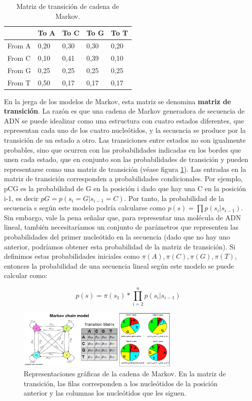 \begin{table}[htbp]
    \centering
    \begin{tabularx}{\textwidth}{ X | X X X X}
          & To A & To C & To G & To T \\ \hline
         From A & 0,20 & 0,30 & 0,30 & 0,20 \\
         From C & 0,10 & 0,41 & 0,39 & 0,10 \\
         From G & 0,25 & 0,25 & 0,25 & 0,25 \\
         From T & 0,50 & 0,17 & 0,17 & 0,17 \\
    \end{tabularx}
    \caption{Matriz de transición de cadena de Markov.}
    \label{tab:matrix}
\end{table}

En la jerga de los modelos de Markov, esta matriz se denomina \textbf{matriz de transición}. La razón es que una cadena de Markov generadora de secuencia de ADN se puede idealizar como una estructura con cuatro estados diferentes, que representan cada uno de los cuatro nucleótidos, y la secuencia se produce por la transición de un estado a otro. Las transiciones entre estados no son igualmente probables, sino que ocurren con las probabilidades indicadas en los bordes que unen cada estado, que en conjunto son las probabilidades de transición y pueden representarse como una matriz de transición (véase figura \ref{fig:markov}).
Las entradas en la matriz de transición corresponden a probabilidades condicionales. Por ejemplo, pCG es la probabilidad de G en la posición i dado que hay una C en la posición i-1, es decir $pG = p(s_i = G|s_{i-1} = C)$. Por tanto, la probabilidad de la secuencia s según este modelo podría calcularse como $ p(s) = \prod p(s_i | s_{i-1}) $. Sin embargo, vale la pena señalar que, para representar una molécula de ADN lineal, también necesitaríamos un conjunto de parámetros que representen las probabilidades del primer nucleótido en la secuencia (dado que no hay uno anterior, podríamos obtener esta probabilidad de la matriz de transición). Si definimos estas probabilidades iniciales como $\pi(A), \pi(C), \pi(G), \pi(T)$, entonces la probabilidad de una secuencia lineal según este modelo se puede calcular como:

 $$ p(s) = \pi(s_1) * \prod_{i=2}^{n} p(s_i | s_{i-1}) $$
 
\begin{figure}[htbp]
\centering
\includegraphics[width = 0.7\textwidth]{figs/markov.png}
\caption{Representaciones gráficas de la cadena de Markov. En la matriz de transición, las filas corresponden a los nucleótidos de la posición anterior y las columnas los nucleótidos que les siguen. }
\label{fig:markov}
\end{figure}
 
